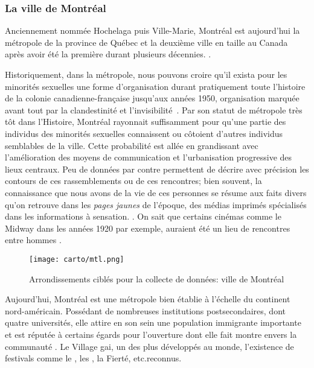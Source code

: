 \subsubsection{La ville de Montréal}
\label{ssub:montreal}
Anciennement nommée Hochelaga puis Ville-Marie, Montréal est aujourd'hui la métropole de la province de Québec et la deuxième ville en taille au Canada après avoir été la première durant plusieurs décennies. 
.


Historiquement, dans la métropole, nous pouvons croire qu'il exista pour les minorités sexuelles une forme d'organisation durant pratiquement toute l'histoire de la colonie canadienne-française jusqu’aux années 1950, organisation marquée avant tout par la clandestinité et l'invisibilité~\citep{Higgins1999}. 
Par son statut de métropole très tôt dans l'Histoire, Montréal rayonnait suffisamment pour qu'une partie des individus des minorités sexuelles connaissent ou côtoient d'autres individus semblables de la ville. 
Cette probabilité est allée en grandissant avec l'amélioration des moyens de communication et l'urbanisation progressive des lieux centraux. 
Peu de données par contre permettent de décrire avec précision les contours de ces rassemblements ou de ces rencontres; bien souvent, la connaissance que nous avons de la vie de ces personnes se résume aux faits divers qu'on retrouve dans les \emph{pages jaunes} de l'époque, des médias imprimés spécialisés dans les informations à sensation. 
\citep[]{Higgins1999}. 
On sait que certains cinémas comme le Midway dans les années 1920 par exemple, auraient été un lieu de rencontres entre hommes\citep[30]{Higgins1999} .
\begin{figure}[ht]
	\centering
	\texttt{[image: carto/mtl.png]}
	\caption{Arrondissements ciblés pour la collecte de données: ville de
    Montréal}\label{fig:espaces_montreal}
\end{figure}
Aujourd'hui, Montréal est une métropole bien établie à l'échelle du continent nord-américain. 
Possédant de nombreuses institutions postsecondaires, dont quatre universités, elle attire en son sein une population immigrante importante et est réputée à certains égards pour l'ouverture dont elle fait montre envers la communauté \lgbt{}. 
Le Village gai, un des plus développés au monde, l'existence de festivals comme le , les , la Fierté, etc.\@sont reconnus.

